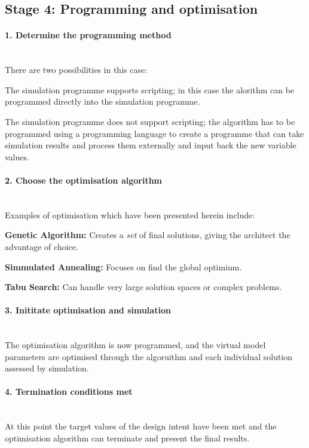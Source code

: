 \documentclass[11pt,a4paper,oneside]{article}
\begin{document}
\begin{multicols}{2}
\subsection*{Stage 4: Programming and optimisation}

\paragraph{1. Determine the programming method}\mbox{}\\

There are two possibilities in this case:
\begin{compactenum}
\item The simulation programme supports scripting; in this case the alorithm can be programmed directly into the simulation programme.
\item The simulation programme does not support scripting; the algorithm has to be programmed using a programming language to create a programme that can take simulation results and process them externally and input back the new variable values.
\end{compactenum}

\paragraph{2. Choose the optimisation algorithm}\mbox{}\\

Examples of optimisation which have been presented herein include:
\begin{compactenum}
\item \textbf{Genetic Algorithm:} Creates a \emph{set} of final solutions, giving the architect the advantage of choice.
\item \textbf{Simmulated Annealing:} Focuses on find the global optimium.
\item \textbf{Tabu Search:} Can handle very large solution spaces or complex problems.
\end{compactenum}

\paragraph{3. Inititate optimisation and simulation}\mbox{}\\

The optimisation algorithm is now programmed, and the virtual model parameters are optimised through the algoruithm and each individual solution assessed by simulation.

\paragraph{4. Termination conditions met}\mbox{}\\

At this point the target values of the design intent have been met and the optimisation algorithm can terminate and present the final results.

\end{multicols}



\end{document}
